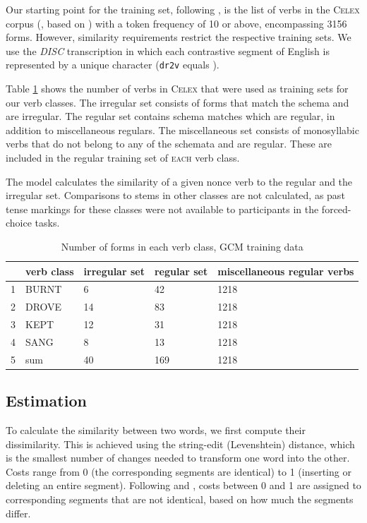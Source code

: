 \documentclass[12pt]{article}
\begin{document}
Our starting point for the training set, following \cite{albright2003rules}, is the list of verbs in the \textsc{Celex} corpus (\citealt{baayen1993celex}, based on \citealt{sinclair1987}) with a token frequency of 10 or above, encompassing 3156 forms. However, similarity requirements restrict the respective training sets. We use the {\em DISC} transcription in which each contrastive segment of English is represented by a unique character (\texttt{dr2v} equals \textipa{[draIv]}).

Table \ref{gcmsetsize} shows the number of verbs in \textsc{Celex} that were used as training sets for our verb classes. The irregular set consists of forms that match the schema and are irregular. The regular set contains schema matches which are regular, in addition to miscellaneous regulars. The miscellaneous set consists of monosyllabic verbs that do not belong to any of the schemata and are regular. These are included in the regular training set of \textsc{ each} verb class. 

The model calculates the similarity of a given nonce verb to the regular and the irregular set. Comparisons to stems in other classes are not calculated, as past tense markings for these classes were not available to participants in the forced-choice tasks.

\begin{table}[ht]
\centering
\begin{tabular}{rllll}
  \hline
 & verb class & irregular set & regular set & miscellaneous regular verbs \\ 
  \hline
1 & BURNT & 6 & 42 & 1218 \\ 
  2 & DROVE & 14 & 83 & 1218 \\ 
  3 & KEPT & 12 & 31 & 1218 \\ 
  4 & SANG & 8 & 13 & 1218 \\ 
  5 & sum & 40 & 169 & 1218 \\ 
   \hline
\end{tabular}
\caption{Number of forms in each verb class, GCM training data} 
\label{gcmsetsize}
\end{table}
\subsection{Estimation}

To calculate the similarity between two words, we first compute their dissimilarity. This is achieved using the string-edit (Levenshtein) distance, which is the smallest number of changes needed to transform one word into the other. Costs range from 0 (the corresponding segments are identical) to 1 (inserting or deleting an entire segment). Following \cite{albright2003rules} and \cite{dawdy2014learnability}, costs between 0 and 1 are assigned to corresponding segments that are not identical, based on how much the segments differ. 
\end{document}
